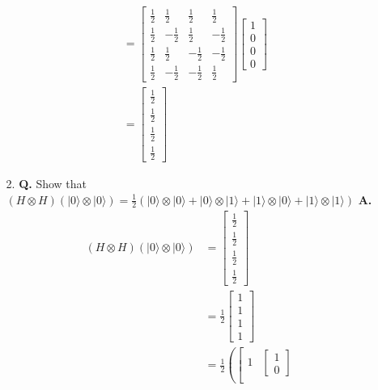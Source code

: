 \documentclass[main.tex]{subfiles}
\begin{document}
\begin{enumerate}
\begin{enumerate}
\begin{align*}
                                        & = \left[\begin{array}{llll}
                                        \frac{1}{2}&\frac{1}{2}&\frac{1}{2}&\frac{1}{2}\\
                                        \frac{1}{2}&-\frac{1}{2}&\frac{1}{2}&-\frac{1}{2}\\
                                        \frac{1}{2}&\frac{1}{2}&-\frac{1}{2}&-\frac{1}{2}\\
                                        \frac{1}{2}&-\frac{1}{2}&-\frac{1}{2}&\frac{1}{2}
                                        \end{array}\right]
                                        \left[\begin{array}{l}1\\0\\0\\0\end{array}\right]\\
                                        & = \left[\begin{array}{l}\frac{1}{2}\\\frac{1}{2}\\\frac{1}{2}\\\frac{1}{2}\end{array}\right]
    \end{align*}
    \item[2.] \textbf{Q.} Show that $(H \otimes H)\left(|0\rangle \otimes|0\rangle\right)=\frac{1}{2}\left(|0\rangle \otimes|0\rangle+|0\rangle \otimes|1\rangle+|1\rangle \otimes|0\rangle+|1\rangle \otimes|1\rangle\right)$ \textbf{A.}
    \begin{align*}
        (H \otimes H)
        \left(|0\rangle\otimes|0\rangle\right)  & = \left[\begin{array}{l}\frac{1}{2}\\\frac{1}{2}\\\frac{1}{2}\\\frac{1}{2}\end{array}\right]\\
                                                & = \frac{1}{2}\left[\begin{array}{l}1\\1\\1\\1\end{array}\right]\\
                                                & = \frac{1}{2}\left(
                                                \left[\begin{array}{ll} 1 & {\left[\begin{array}{l} 1 \\ 0 \end{array}\right]} \\

\end{array}
\end{align*}
\end{enumerate}
\end{enumerate}
\end{document}
